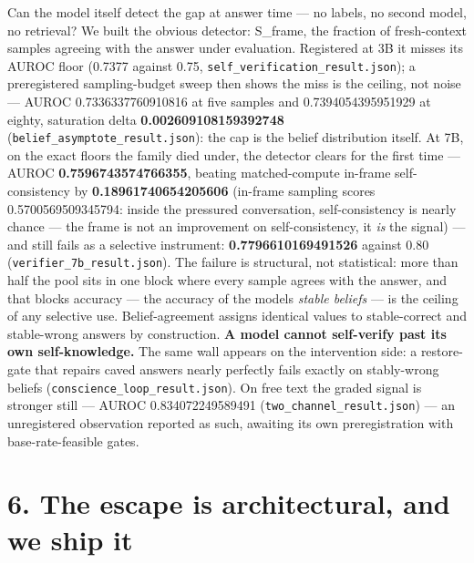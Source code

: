 \documentclass[11pt]{article}
\begin{document}
Can the model itself detect the gap at answer time --- no labels, no second model, no retrieval? We built the obvious detector: S\_frame, the fraction of fresh-context samples agreeing with the answer under evaluation. Registered at 3B it misses its AUROC floor (0.7377 against 0.75, \texttt{self\_verification\_result.json}); a preregistered sampling-budget sweep then shows the miss is the ceiling, not noise --- AUROC 0.7336337760910816 at five samples and 0.7394054395951929 at eighty, saturation delta \textbf{0.002609108159392748} (\texttt{belief\_asymptote\_result.json}): the cap is the belief distribution itself. At 7B, on the exact floors the family died under, the detector clears for the first time --- AUROC \textbf{0.7596743574766355}, beating matched-compute in-frame self-consistency by \textbf{0.18961740654205606} (in-frame sampling scores 0.5700569509345794: inside the pressured conversation, self-consistency is nearly chance --- the frame is not an improvement on self-consistency, it \emph{is} the signal) --- and still fails as a selective instrument: \textbf{0.7796610169491526} against 0.80 (\texttt{verifier\_7b\_result.json}). The failure is structural, not statistical: more than half the pool sits in one block where every sample agrees with the answer, and that block\textquotesingle s accuracy --- the accuracy of the model\textquotesingle s \emph{stable beliefs} --- is the ceiling of any selective use. Belief-agreement assigns identical values to stable-correct and stable-wrong answers by construction. \textbf{A model cannot self-verify past its own self-knowledge.} The same wall appears on the intervention side: a restore-gate that repairs caved answers nearly perfectly fails exactly on stably-wrong beliefs (\texttt{conscience\_loop\_result.json}). On free text the graded signal is stronger still --- AUROC 0.834072249589491 (\texttt{two\_channel\_result.json}) --- an unregistered observation reported as such, awaiting its own preregistration with base-rate-feasible gates.

\section{6. The escape is architectural, and we ship it}\label{6-the-escape-is-architectural-and-we-ship-it}
\end{document}
